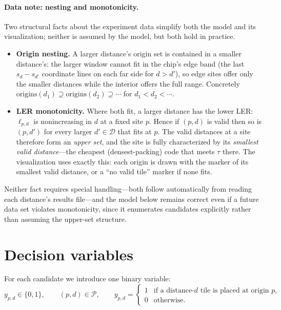 \documentclass[11pt]{article}
\newcommand{\Pset}{\mathcal{P}}
\newcommand{\Dset}{\mathcal{D}}
\begin{document}
\paragraph{Data note: nesting and monotonicity.}
Two structural facts about the experiment data simplify both the model and its
visualization; neither is assumed by the model, but both hold in practice.
\begin{itemize}[itemsep=2pt]
  \item \textbf{Origin nesting.} A larger distance's origin set is contained in a
        smaller distance's: the larger window cannot fit in the chip's edge band
        (the last $s_d - s_{d'} $ coordinate lines on each far side for $d > d'$),
        so edge sites offer only the smaller distances while the interior offers
        the full range. Concretely
        $\text{origins}(d_1) \supseteq \text{origins}(d_2) \supseteq \cdots$ for
        $d_1 < d_2 < \cdots$.
  \item \textbf{LER monotonicity.} Where both fit, a larger distance has the lower
        LER: $\ell_{p,d}$ is nonincreasing in $d$ at a fixed site $p$. Hence if
        $(p, d)$ is valid then so is $(p, d')$ for every larger $d' \in \Dset$ that
        fits at $p$. The valid distances at a site therefore form an \emph{upper
        set}, and the site is fully characterized by its \emph{smallest valid
        distance}---the cheapest (densest-packing) code that meets $\tau$ there.
        The visualization uses exactly this: each origin is drawn with the marker
        of its smallest valid distance, or a ``no valid tile'' marker if none fits.
\end{itemize}
Neither fact requires special handling---both follow automatically from reading
each distance's results file---and the model below remains correct even if a future
data set violates monotonicity, since it enumerates candidates explicitly rather
than assuming the upper-set structure.

\section{Decision variables}

For each candidate we introduce one binary variable:
\[
  y_{p,d} \in \{0,1\}, \qquad (p,d) \in \Pset,
  \qquad
  y_{p,d} =
  \begin{cases}
    1 & \text{if a distance-$d$ tile is placed at origin } p,\\
    0 & \text{otherwise.}
  \end{cases}
\]
\end{document}
